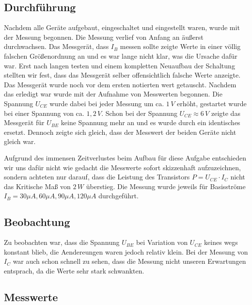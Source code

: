 \subsection{Durchführung}
Nachdem alle Geräte aufgebaut, eingeschaltet und eingestellt waren, wurde mit der Messung begonnen. Die Messung verlief von Anfang an äußerst durchwachsen. Das Messgerät, dass \(I_B\) messen sollte zeigte Werte in einer völlig falschen Größenordnung an und es war lange nicht klar, was die Ursache dafür war. Erst nach langen testen und einem kompletten Neuaufbau der Schaltung stellten wir fest, dass das Messgerät selber offensichtlich falsche Werte anzeigte. Das Messgerät wurde noch vor dem ersten notierten wert getauscht. Nachdem das erledigt war wurde mit der Aufnahme von Messwerten begonnen. Die Spannung \(U_{CE}\) wurde dabei bei jeder Messung um ca. \(1\,V\) erhöht, gestartet wurde bei einer Spannung von ca. \(1,2\,V\). Schon bei der Spannung \(U_{CE} \approx 6\,V\) zeigte das Messgerät für \(U_{BE}\) keine Spannung mehr an und es wurde durch ein identisches ersetzt. Dennoch zeigte sich gleich, dass der Messwert der beiden Geräte nicht gleich war. 

Aufgrund des immensen Zeitverlustes beim Aufbau für diese Aufgabe entschieden wir uns dafür nicht wie gedacht die Messwerte sofort skizzenhaft aufzuzeichnen, sondern achteten nur darauf, dass die Leistung des Transistors 
\(P = U_{CE} \cdot I_C \) nicht das Kritische Maß von \(2\,W\) überstieg. Die Messung wurde jeweils für Basisströme 
\(I_B = 30 \mu A, 60 \mu A, 90 \mu A, 120 \mu A\) durchgeführt.

\subsection{Beobachtung}
Zu beobachten war, dass die Spannung \(U_{BE}\) bei Variation von \(U_{CE}\) keines wegs konstant blieb, die Aendereungen waren jedoch relativ klein. Bei der Messung von \(I_{C}\) war auch schon schnell zu sehen, dass die Messung nicht unseren Erwartungen entsprach, da die Werte sehr stark schwankten.

\subsection{Messwerte}

\begin{center}

\vspace{0.5cm}


\vspace{0.5cm}


\vspace{0.5cm}


\vspace{0.5cm}
\end{center}
